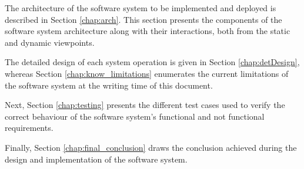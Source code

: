 The architecture of the software system to be implemented and deployed is
described in Section \ref{chap:arch}. This section presents the components of
the software system architecture along with their interactions, both from the static and dynamic viewpoints.

The detailed design of each \gls{system operation} is given in Section
\ref{chap:detDesign}, whereas Section \ref{chap:know_limitations} enumerates the
current limitations of the software system at the writing time of this document.

Next, Section \ref{chap:testing} presents the different test cases used to
verify the correct behaviour of the software system's functional and not functional requirements.

Finally, Section \ref{chap:final_conclusion} draws the
conclusion achieved during the design and implementation of the software system.
 
 